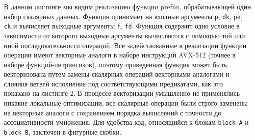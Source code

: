 В данном листинге мы видим реализацию функции prefun, обрабатывающей один набор скалярных данных.
Функция принимает на входные аргументы \texttt{p}, \texttt{dk}, \texttt{pk}, \texttt{ck} и вычисляет выходные аргументы \texttt{f}, \texttt{fd}.
Функция содержит одно условие в зависимости от которого выходные аргументы вычисляются с помощью той или иной последовательности операций.
Все задействованные в реализации функции операции имеют векторные аналоги в наборе инструкций AVX-512 (точнее в наборе функций-интринсиков), поэтому приведенная функция может быть векторизована путем замены скалярных операций векторными аналогами и слияния ветвей исполнения под соответствующими предикатами, как это показано на листинге 2.
В процессе векторизации умышленно не применялись никакие локальные оптимизации, все скалярные операции были строго заменены на векторные аналоги с сохранением порядка вычислений с точности до ассоциативности умножения.
Для удобства код, относящийся к блокам \texttt{block A} и \texttt{block B}, заключен в фигурные скобки.

